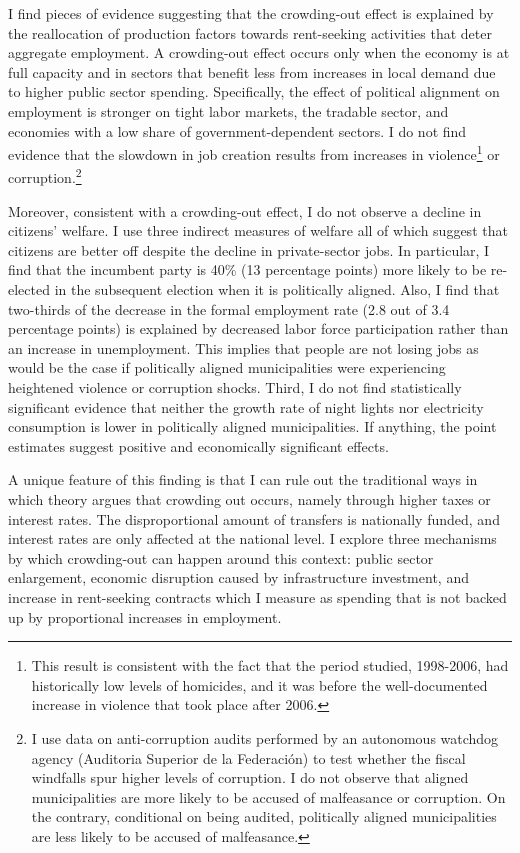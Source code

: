 \documentclass[dv_diss_main.tex]{subfiles}
\begin{document}
I find pieces of evidence suggesting that the crowding-out effect is explained by the reallocation of production factors towards rent-seeking activities that deter aggregate employment. A crowding-out effect occurs only when the economy is at full capacity and in sectors that benefit less from increases in local demand due to higher public sector spending. Specifically, the effect of political alignment on employment is stronger on tight labor markets, the tradable sector, and economies with a low share of government-dependent sectors.  
I do not find evidence that the slowdown in job creation results from increases in violence\footnote{ 
This result is consistent with the fact that the period studied, 1998-2006, had historically low levels of homicides, and it was before the well-documented increase in violence that took place after 2006.} or corruption.\footnote{ 
I use data on anti-corruption audits performed by an autonomous watchdog agency (Auditoria Superior de la Federación) to test whether the fiscal windfalls spur higher levels of corruption. I do not observe that aligned municipalities are more likely to be accused of malfeasance or corruption. On the contrary, conditional on being audited, politically aligned municipalities are less likely to be accused of malfeasance.}

Moreover, consistent with a crowding-out effect, I do not observe a decline in citizens' welfare. I use three indirect measures of welfare all of which suggest that citizens are better off despite the decline in private-sector jobs. In particular, I find that the incumbent party is  40\% (13 percentage points) more likely to be re-elected in the subsequent election when it is politically aligned. Also, I find that two-thirds of the decrease in the formal employment rate (2.8 out of 3.4 percentage points) is explained by decreased labor force participation rather than an increase in unemployment. This implies that people are not losing jobs as would be the case if politically aligned municipalities were experiencing heightened violence or corruption shocks. Third, I do not find statistically significant evidence that neither the growth rate of night lights nor electricity consumption is lower in politically aligned municipalities. If anything, the point estimates suggest positive and economically significant effects.

A unique feature of this finding is that I can rule out the traditional ways in which theory argues that crowding out occurs, namely through higher taxes or interest rates. The disproportional amount of transfers is nationally funded, and interest rates are only affected at the national level. I explore three mechanisms by which crowding-out can happen around this context: public sector enlargement, economic disruption caused by infrastructure investment, and increase in rent-seeking contracts which I measure as spending that is not backed up by proportional increases in employment.
\end{document}
